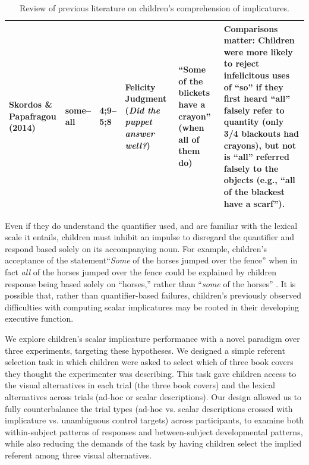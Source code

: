 \documentclass[man]{apa2}
\begin{document}
\begin{landscape}
\begin{table}[!ht]
\begin{tabular}{| p{2.2cm} | p{2cm} | p{1.69cm} | p{4.5cm} | p{5cm} | p{7.2cm} |}
\parbox[t]{2.2cm}{Skordos \&\\Papafragou (2014)} & some--all & 4;9--5;8 & Felicity Judgment (\textit{Did the puppet answer well?}) & ``Some of the blickets have a crayon'' (when all of them do)  & Comparisons matter: Children were more likely to reject infelicitous uses of ``so'' if they first heard ``all'' falsely refer to quantity (only 3/4 blackouts had crayons), but not is ``all'' referred falsely to the objects (e.g., ``all of the blackest have a scarf'').\\ \hline \end{tabular} 
\caption{\label{tab:lit_review}Review of previous literature on children's comprehension of implicatures.} 
\end{table}
\end{landscape}
\restoregeometry


Even if they do understand the quantifier used, and are familiar with the lexical scale it entails, children must inhibit an impulse to disregard the quantifier and respond based solely on its accompanying noun. For example, children's acceptance of the statement``\emph{Some} of the horses jumped over the fence'' when in fact \emph{all} of the horses jumped over the fence could be explained by children response being based solely on ``horses,'' rather than ``\emph{some} of the horses'' \cite{papafragou2003}. It is possible that, rather than quantifier-based failures, children's previously observed difficulties with computing scalar implicatures may be rooted in their developing executive function. 

We explore children's scalar implicature performance with a novel paradigm over three experiments, targeting these hypotheses. We designed a simple referent selection task in which children were asked to select which of three book covers they thought the experimenter was describing. This task gave children access to the visual alternatives in each trial (the three book covers) and the lexical alternatives across trials (ad-hoc or scalar descriptions). Our design allowed us to fully counterbalance the trial types (ad-hoc vs. scalar descriptions crossed with implicature vs. unambiguous control targets) across participants, to examine both within-subject patterns of responses and between-subject developmental patterns, while also reducing the demands of the task by having children select the implied referent among three visual alternatives.
\end{document}
